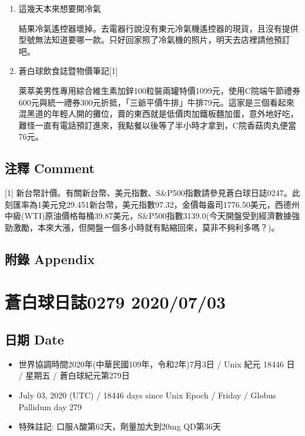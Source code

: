 \documentclass[a5paper, 11pt
]{book}
\providecommand{\tightlist}{%
  \setlength{\itemsep}{0pt}\setlength{\parskip}{0pt}}
\begin{document}
\begin{enumerate}
\def\labelenumi{\arabic{enumi}.}
\item
  這幾天本來想要開冷氣

  結果冷氣遙控器壞掉。去電器行說沒有東元冷氣機遙控器的現貨，且沒有提供型號無法知道要哪一款。只好回家照了冷氣機的照片，明天去店裡請他預訂吧。
\item
  蒼白球飲食誌暨物價筆記{[}1{]}

  萊萃美男性專用綜合維生素加鋅100粒裝兩罐特價1099元，使用C院端午節禮券600元與統一禮券300元折抵，「三爺平價牛排」牛排79元。這家是三個看起來混黑道的年輕人開的攤位，賣的東西就是低價肉加鐵板麵加蛋，意外地好吃，難怪一直有電話預訂進來，我點餐以後等了半小時才拿到，C院香菇肉丸便當76元。
\end{enumerate}

\hypertarget{ux6ce8ux91cb-comment-31}{%
\subsection{注釋 Comment}\label{ux6ce8ux91cb-comment-31}}

{[}1{]}
新台幣計價。有關新台幣、美元指數、S\&P500指數請參見蒼白球日誌0247。此刻匯率為1美元兌29.451新台幣，美元指數97.32，金價每盎司1776.50美元，西德州中級(WTI)原油價格每桶39.87美元，S\&P500指數3139.0(今天開盤受到經濟數據強勁激勵，本來大漲，但開盤一個多小時就有點縮回來，莫非不夠利多嗎？)。

\hypertarget{ux9644ux9304-appendix-31}{%
\subsection{附錄 Appendix}\label{ux9644ux9304-appendix-31}}

\hypertarget{ux84bcux767dux7403ux65e5ux8a8c0279-20200703}{%
\section{蒼白球日誌0279
2020/07/03}\label{ux84bcux767dux7403ux65e5ux8a8c0279-20200703}}

\hypertarget{ux65e5ux671f-date-32}{%
\subsection{日期 Date}\label{ux65e5ux671f-date-32}}

\begin{itemize}
\tightlist
\item
  世界協調時間2020年(中華民國109年，令和2年)7月3日 / Unix 紀元 18446 日
  / 星期五 / 蒼白球紀元第279日
\item
  July 03, 2020 (UTC) / 18446 days since Unix Epoch / Friday / Globus
  Pallidum day 279
\item
  特殊註記: 口服A酸第62天，劑量加大到20mg QD第36天
\end{itemize}
\end{document}
